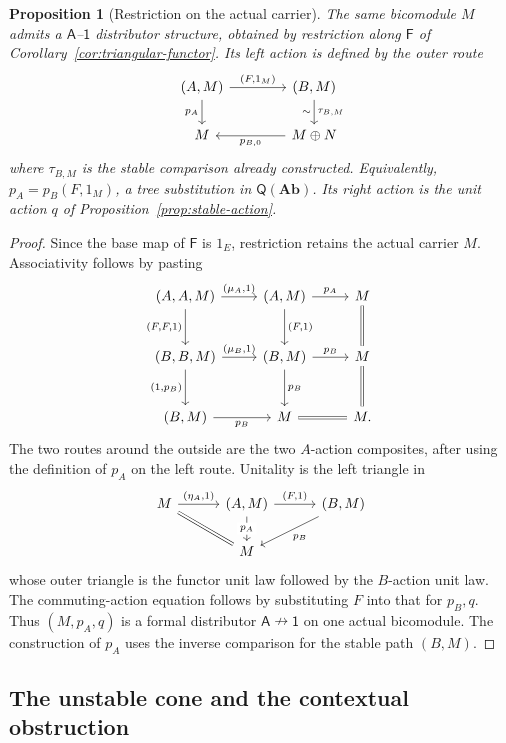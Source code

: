 \documentclass[11pt,a4paper]{article}
\newtheorem{proposition}[theorem]{Proposition}
\theoremstyle{definition}
\theoremstyle{remark}
\numberwithin{equation}{section}
\newcommand{\Q}{\mathsf Q}
\newcommand{\Ab}{\mathbf{Ab}}
\newcommand{\Icat}{\mathsf 1}
\newcommand{\harr}{\mathrel{\nrightarrow}}
\begin{document}
\begin{proposition}[Restriction on the actual carrier]\label{prop:restricted-action}
The same bicomodule $M$ admits a $\mathsf A$--$\Icat$ distributor
structure, obtained by restriction along
$\mathsf F$ of Corollary~\ref{cor:triangular-functor}. Its left action
is defined by the outer route
\begin{equation}\label{eq:pA}
\begin{tikzcd}[column sep=4em]
(A,M) \arrow[r,"{(F,1_M)}"] \arrow[d,"p_A"'] &
(B,M) \arrow[d,"\tau_{B,M}","\sim"']\\
M & M\oplus N \arrow[l,"p_{B,0}"]
\end{tikzcd}
\end{equation}
where $\tau_{B,M}$ is the stable comparison already constructed.
Equivalently, $p_A=p_B(F,1_M)$, a tree substitution in $\Q(\Ab)$.
Its right action is the unit action $q$ of
Proposition~\ref{prop:stable-action}.
\end{proposition}
\begin{proof}
Since the base map of $\mathsf F$ is $1_E$, restriction retains the
actual carrier $M$. Associativity follows by pasting
\[
\begin{tikzcd}[column sep=2.5em,row sep=2.6em]
(A,A,M) \arrow[r,"{(\mu_A,1)}"] \arrow[d,"{(F,F,1)}"'] &
(A,M) \arrow[r,"p_A"] \arrow[d,"{(F,1)}"] &
M \arrow[d,equal]\\
(B,B,M) \arrow[r,"{(\mu_B,1)}"] \arrow[d,"{(1,p_B)}"'] &
(B,M) \arrow[r,"p_B"] \arrow[d,"p_B"] &
M \arrow[d,equal]\\
(B,M) \arrow[r,"p_B"'] & M \arrow[r,equal] & M.
\end{tikzcd}
\]
The two routes around the outside are the two $A$-action composites,
after using the definition of $p_A$ on the left route.
Unitality is the left triangle in
\[
\begin{tikzcd}[column sep=3em]
M \arrow[r,"{(\eta_A,1)}"] \arrow[dr,equal] &
(A,M) \arrow[r,"{(F,1)}"] \arrow[d,"p_A" description] &
(B,M) \arrow[dl,"p_B"]\\
& M &
\end{tikzcd}
\]
whose outer triangle is the functor unit law followed by the $B$-action
unit law.
The commuting-action equation follows by substituting $F$ into that for
$p_B,q$. Thus $(M,p_A,q)$ is a formal distributor
$\mathsf A\harr\Icat$ on one actual bicomodule. The construction of
$p_A$ uses the inverse comparison for the stable path $(B,M)$.
\end{proof}

\subsection{The unstable cone and the contextual obstruction}
\end{document}
